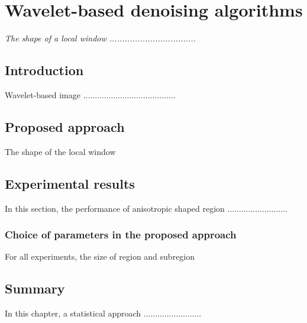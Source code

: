 \chapter{Wavelet-based denoising algorithms}
\label{C5} %
\graphicspath{{Figures/Chapter-5figs/PDF/}{Figures/Chapter-5figs/}}
\textit{The shape of a local window ..................................}
\section{Introduction} \label{S5.1}
Wavelet-based image \cite{gonzalez2002digital}........................................
\section{Proposed approach} \label{S5.3}
The shape of the local window 
\section{Experimental results} \label{S5.4}
In this section, the performance of anisotropic shaped region ..........................
\subsection{Choice of parameters in the proposed approach} \label{SS5.4.1}
For all experiments, the size of region and subregion 
\section{Summary}
In this chapter, a statistical approach .........................
 